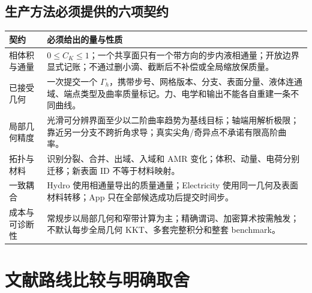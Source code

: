 \documentclass[11pt,a4paper]{article}
\begin{document}
\subsection{生产方法必须提供的六项契约}
\begin{longtable}{L{31mm}L{118mm}}
\toprule 契约 & 必须给出的量与性质\\\midrule\endhead
相体积与通量 & $0\le C_K\le1$；一个共享面只有一个带方向的步内液相通量；开放边界显式记账；不通过删小滴、截断后不补偿或全局缩放保质量。\\
已接受几何 & 一次提交一个 $\Gamma_h$，携带步号、网格版本、分支、表面分量、液体连通域、端点类型及曲率质量标记。力、电学和输出不能各自重建一条不同曲线。\\
局部几何精度 & 光滑可分辨界面至少以二阶曲率趋势为基线目标；轴端用解析极限；靠近另一分支不跨折角求导；真实尖角/奇异点不承诺有限高阶曲率。\\
拓扑与材料 & 识别分裂、合并、出域、入域和 AMR 变化；体积、动量、电荷分别迁移；新表面 ID 不等于材料映射。\\
一致耦合 & Hydro 使用相通量导出的质量通量；Electricity 使用同一几何及表面材料转移；App 只在全部候选成功后提交时间步。\\
成本与可诊断性 & 常规步以局部几何和窄带计算为主；精确谓词、加密算术按需触发；不默认每步全局几何 KKT、多套完整积分和整套 benchmark。\\\bottomrule
\end{longtable}

\clearpage
\section{文献路线比较与明确取舍}
\end{document}
